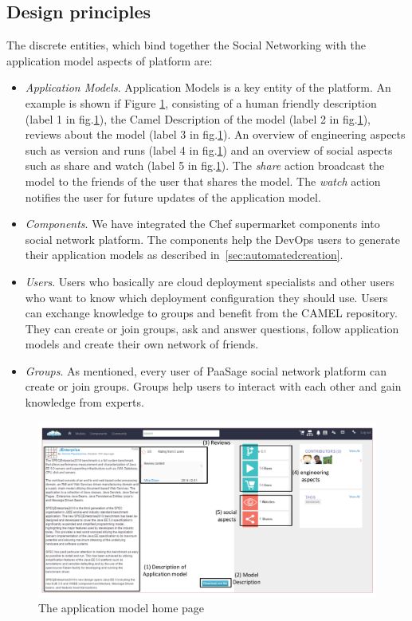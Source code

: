 \subsection{Design principles}
The discrete entities, which bind together the Social Networking with the application model aspects of platform are:
\begin{itemize}
\item \emph{Application Models}. Application Models is a key entity of the platform. An example is shown if Figure \ref{fig:jenter_home}, consisting of a human friendly description (label 1 in fig.\ref{fig:jenter_home}), the Camel Description of the model (label 2 in fig.\ref{fig:jenter_home}), reviews about the model (label 3 in fig.\ref{fig:jenter_home}). An overview of engineering aspects such as version and runs (label 4 in fig.\ref{fig:jenter_home}) and an overview of social aspects such as share and watch (label 5 in fig.\ref{fig:jenter_home}). The {\it share} action broadcast the model to the friends of the user that shares the model. The {\it watch} action notifies the user for future updates of the application model. 
\item \emph{Components}. We have integrated the Chef supermarket components into social network platform. The components help the DevOps users to generate their application models as described in~\ref{sec:automatedcreation}. 
\item \emph{Users}. Users who basically are cloud deployment specialists and other users who want to know which deployment configuration they should use. Users can exchange knowledge to groups and benefit from the CAMEL repository. They can create or join groups, ask and answer questions, follow application models and create their own network of friends.
\item \emph{Groups}. As mentioned, every user of PaaSage social network platform can create or join groups. Groups help users to interact with each other and gain knowledge from experts.
\end{itemize}

\begin{figure}[h]
	\centering
	\includegraphics[width=1\textwidth,natwidth=200,natheight=150]{./fig/jenterprise_home_page.pdf}
	\caption{The application model home page}
	\label{fig:jenter_home}
\end{figure}


